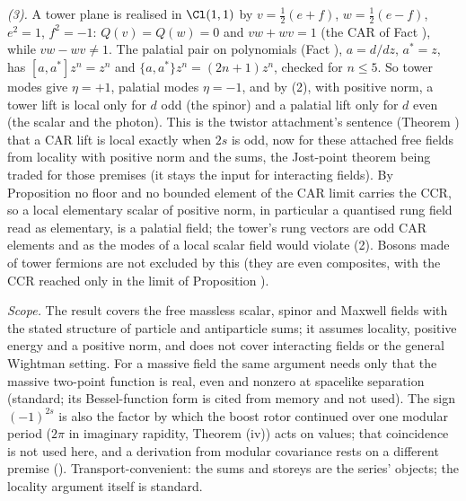 \emph{(3).} A tower plane is realised in $\Cl(1,1)$ by $v = \tfrac12(e + f)$, $w = \tfrac12(e - f)$, $e^{2} = 1$, $f^{2} = -1$: $Q(v) = Q(w) = 0$ and $vw + wv = 1$ (the CAR of Fact ), while $vw - wv \neq 1$. The palatial pair on polynomials (Fact ), $a = d/dz$, $a^{*} = z$, has $[a, a^{*}]z^{n} = z^{n}$ and $\{a, a^{*}\}z^{n} = (2n + 1)z^{n}$, checked for $n \le 5$. So tower modes give $\eta = +1$, palatial modes $\eta = -1$, and by (2), with positive norm, a tower lift is local only for $d$ odd (the spinor) and a palatial lift only for $d$ even (the scalar and the photon). This is the twistor attachment's sentence (Theorem ) that a CAR lift is local exactly when $2s$ is odd, now for these attached free fields from locality with positive norm and the sums, the Jost-point theorem being traded for those premises (it stays the input for interacting fields). By Proposition  no floor and no bounded element of the CAR limit carries the CCR, so a local elementary scalar of positive norm, in particular a quantised rung field read as elementary, is a palatial field; the tower's rung vectors are odd CAR elements and as the modes of a local scalar field would violate (2). Bosons made of tower fermions are not excluded by this (they are even composites, with the CCR reached only in the limit of Proposition ).

\emph{Scope.} The result covers the free massless scalar, spinor and Maxwell fields with the stated structure of particle and antiparticle sums; it assumes locality, positive energy and a positive norm, and does not cover interacting fields or the general Wightman setting. For a massive field the same argument needs only that the massive two-point function is real, even and nonzero at spacelike separation (standard; its Bessel-function form is cited from memory and not used). The sign $(-1)^{2s}$ is also the factor by which the boost rotor continued over one modular period ($2\pi$ in imaginary rapidity, Theorem (iv)) acts on values; that coincidence is not used here, and a derivation from modular covariance rests on a different premise (). Transport-convenient: the sums and storeys are the series' objects; the locality argument itself is standard.
